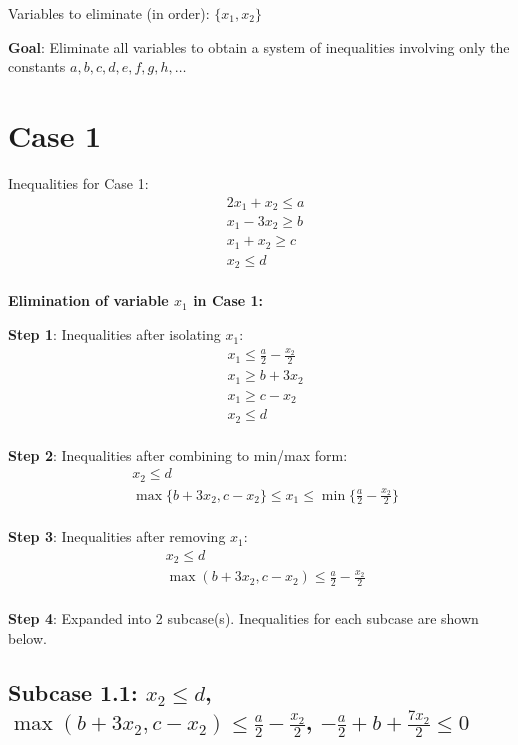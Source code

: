 \documentclass{article}
\begin{document}
Variables to eliminate (in order): $\{x_{1}, x_{2}\}$

\textbf{Goal}: Eliminate all variables to obtain a system of inequalities
involving only the constants $a, b, c, d, e, f, g, h, \ldots$

\section{Case 1}

Inequalities for Case 1:
\begin{align}
& 2 x_{1} + x_{2} \leq a \\
& x_{1} - 3 x_{2} \geq b \\
& x_{1} + x_{2} \geq c \\
& x_{2} \leq d \\
\end{align}

\textbf{Elimination of variable $x_{1}$ in Case 1:}

\textbf{Step 1}: Inequalities after isolating $x_{1}$:
\begin{align}
& x_{1} \leq \frac{a}{2} - \frac{x_{2}}{2} \\
& x_{1} \geq b + 3 x_{2} \\
& x_{1} \geq c - x_{2} \\
& x_{2} \leq d \\
\end{align}

\textbf{Step 2}: Inequalities after combining to min/max form:
\begin{align}
& x_{2} \leq d \\
& \max\{b + 3 x_{2}, c - x_{2}\} \leq x_{1} \leq \min\{\frac{a}{2} - \frac{x_{2}}{2}\} \\
\end{align}

\textbf{Step 3}: Inequalities after removing $x_{1}$:
\begin{align}
& x_{2} \leq d \\
& \max\left(b + 3 x_{2}, c - x_{2}\right) \leq \frac{a}{2} - \frac{x_{2}}{2} \\
\end{align}

\textbf{Step 4}: Expanded into 2 subcase(s). Inequalities for each subcase are shown below.

\subsection{Subcase 1.1: $x_{2} \leq d$, $\max\left(b + 3 x_{2}, c - x_{2}\right) \leq \frac{a}{2} - \frac{x_{2}}{2}$, $- \frac{a}{2} + b + \frac{7 x_{2}}{2} \leq 0$}
\end{document}

